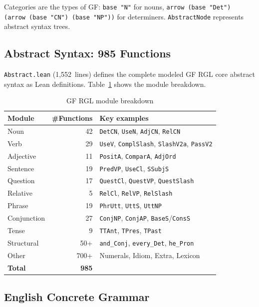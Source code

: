 \documentclass[11pt]{article}
\newcommand{\code}[1]{\texttt{#1}}
\newcommand{\GF}{\textup{GF}}
\newcommand{\RGL}{\textup{RGL}}
\begin{document}
Categories are the types of \GF{}: \code{base "N"} for nouns, \code{arrow
(base "Det") (arrow (base "CN") (base "NP"))} for determiners.
\code{AbstractNode} represents abstract syntax trees.

\subsection{Abstract Syntax: 985 Functions}

\code{Abstract.lean} (1,552~lines) defines the complete modeled \GF{} \RGL{} core abstract
syntax as Lean definitions.  Table~\ref{tab:rgl} shows the module breakdown.

\begin{table}[ht]
\centering
\caption{GF RGL module breakdown}
\label{tab:rgl}
\begin{tabular}{@{}lrl@{}}
\toprule
\textbf{Module} & \textbf{\#Functions} & \textbf{Key examples} \\
\midrule
Noun      & 42 & \code{DetCN}, \code{UseN}, \code{AdjCN}, \code{RelCN} \\
Verb      & 29 & \code{UseV}, \code{ComplSlash}, \code{SlashV2a}, \code{PassV2} \\
Adjective & 11 & \code{PositA}, \code{ComparA}, \code{AdjOrd} \\
Sentence  & 19 & \code{PredVP}, \code{UseCl}, \code{SSubjS} \\
Question  & 17 & \code{QuestCl}, \code{QuestVP}, \code{QuestSlash} \\
Relative  &  5 & \code{RelCl}, \code{RelVP}, \code{RelSlash} \\
Phrase    & 19 & \code{PhrUtt}, \code{UttS}, \code{UttNP} \\
Conjunction & 27 & \code{ConjNP}, \code{ConjAP}, \code{BaseS}/\code{ConsS} \\
Tense     &  9 & \code{TTAnt}, \code{TPres}, \code{TPast} \\
Structural & 50+ & \code{and\_Conj}, \code{every\_Det}, \code{he\_Pron} \\
Other     & 700+ & Numerals, Idiom, Extra, Lexicon \\
\midrule
\textbf{Total} & \textbf{985} & \\
\bottomrule
\end{tabular}
\end{table}

\subsection{English Concrete Grammar}
\end{document}
